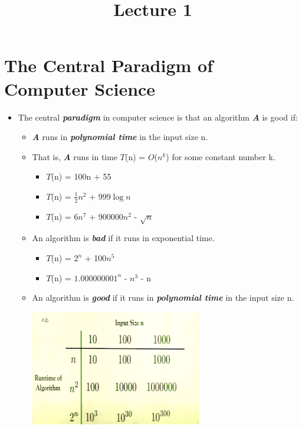 \documentclass[12pt]{article}
\title{\huge Lecture 1}
\author{}
\date{}
\begin{document}
\maketitle

\section{The Central Paradigm of Computer Science}
\renewcommand{\labelitemii}{$\circ$}
\renewcommand{\labelitemiii}{$\cdot$}
\begin{itemize}
\item The central \textbf{\textit{paradigm}}  in computer science is that an algorithm \textbf{\textit{A}} is good if:
	\begin{itemize}
	\item \textbf{\textit{A}} runs in \textbf{\textit{polynomial time}} in the input size n.
	\item That is, \textbf{\textit{A}} runs in time $T$(n) = $O$($n^k$) for some constant number k.
		\begin{itemize}
		\item $T$(n) = 100n + 55
		\item $T$(n) = \( \frac{1}{2} \)$n^2$ + $999\log{}n$
		\item $T$(n) = 6$n^7$ + 900000$n^2$ - $\sqrt{n}$			
		\end{itemize}
	\item An algorithm is \textbf{\textit{bad}} if it runs in exponential time.
		\begin{itemize}
		\item $T$(n) = $2^n$ + 100$n^5$
		\item $T$(n) = $1.000000001^n$ - $n^3$ - n 
		\end{itemize}	
	\item An algorithm is \textbf{\textit{good}} if it runs in \textbf{\textit{polynomial time}} in the input size n.
	\begin{center}
	\includegraphics{lecture1a}
	\end{center}
	\end{itemize}
\end{itemize}
\end{document}
